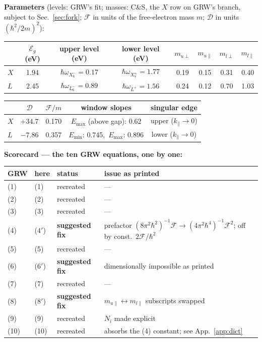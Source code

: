 \documentclass[11pt,a4paper]{article}
\numberwithin{equation}{section}
\newcommand{\Eg}{\mathcal{E}_g}
\newcommand{\cD}{\mathcal{D}}
\newcommand{\cF}{\mathcal{F}}
\newcommand{\kpar}{k_{\parallel}}
\newcommand{\wXu}{\hbar\omega_{X_6^-}}
\newcommand{\wXl}{\hbar\omega_{X_7^+}}
\newcommand{\wLu}{\hbar\omega_{L_6^-}}
\newcommand{\wLl}{\hbar\omega_{L^+}}
\begin{document}
\noindent\textbf{Parameters} (levels: GRW's fit; masses: C\&S, the $X$
row on GRW's branch, subject to Sec.~\ref{sec:fork}; $\cF$ in units of
the free-electron mass $m$; $\cD$ in units $(\hbar^2/2m)^2$):

\begin{center}
\small
\begin{tabular}{lccccccc}
\toprule
 & $\Eg$ (eV) & upper level (eV) & lower level (eV)
 & $m_{u\perp}$ & $m_{u\parallel}$ & $m_{l\perp}$ & $m_{l\parallel}$\\
\midrule
$X$ & 1.94 & $\wXu=0.17$ & $\wXl=1.77$ & 0.19 & 0.15 & 0.31 & 0.40\\
$L$ & 2.45 & $\wLu=0.89$ & $\wLl=1.56$ & 0.24 & 0.12 & 0.70 & 1.03\\
\bottomrule
\end{tabular}

\medskip
\begin{tabular}{lcccc}
\toprule
 & $\cD$ & $\cF/m$ & window slopes & singular edge\\
\midrule
$X$ & $+34.7$ & 0.170 & $E_{\max}$ (above gap): 0.62 & upper ($\kpar\to0$)\\
$L$ & $-7.86$ & 0.357 & $E_{\min}$: 0.745,\ $E_{\max}$: 0.896 & lower ($\kpar\to0$)\\
\bottomrule
\end{tabular}
\end{center}

\medskip
\noindent\textbf{Scorecard --- the ten GRW equations, one by one:}

\begin{center}
\small
\begin{tabular}{llll}
\toprule
GRW & here & status & issue as printed\\
\midrule
(1)  & (1)    & recreated & ---\\
(2)  & (2)    & recreated & ---\\
(3)  & (3)    & recreated & ---\\
(4)  & ($4'$) & \textbf{suggested fix} &
prefactor $(8\pi^2\hbar^2)^{-1}\cF\to(4\pi^2\hbar^4)^{-1}\cF^2$;
off by const.\ $2\cF/\hbar^2$\\
(5)  & (5)    & recreated & ---\\
(6)  & ($6'$) & \textbf{suggested fix} & dimensionally impossible as printed\\
(7)  & (7)    & recreated & ---\\
(8)  & ($8'$) & \textbf{suggested fix} &
$m_{u\parallel}\leftrightarrow m_{l\parallel}$ subscripts swapped\\
(9)  & (9)    & recreated & $N_i$ made explicit\\
(10) & (10)   & recreated & absorbs the (4) constant; see App.~\ref{app:dict}\\
\bottomrule
\end{tabular}
\end{center}
\end{document}
